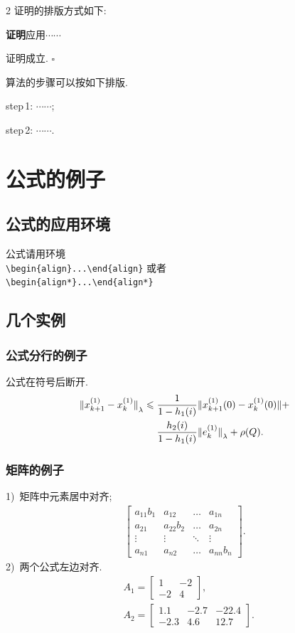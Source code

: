 \documentclass{ctacn}%
\begin{document}
\begin{multicols}{2}
证明的排版方式如下:

\textbf{证明}\quad 应用$\cdots\cdots$

证明成立. {\Large$\square$}

算法的步骤可以按如下排版.

step\,1: $\cdots\cdots$;

step\,2: $\cdots\cdots$.


\section{公式的例子}
\subsection{公式的应用环境}
公式请用环境\\
\verb|\begin{align}...\end{align}|
或者\\
\verb|\begin{align*}...\end{align*}|%
\subsection{几个实例}

\subsubsection{公式分行的例子}
公式在符号后断开.
\begin{align}
{\Arrowvert x^{(1)}_{k+1}-x^{(1)}_k\Arrowvert}_\lambda\leqslant \;&
\frac{1}{1-h_1(i)}\Arrowvert x^{(1)}_{k+1}(0)-x^{(1)}_k(0)\Arrowvert+\notag\\
&\frac{h_2(i)}{1-h_1(i)}{\Arrowvert
	e^{(1)}_k\Arrowvert}_\lambda+\rho(Q).
\end{align}


\subsubsection{矩阵的例子}
1)~矩阵中元素居中对齐;
\begin{align}
\left[\begin{array}{cccc}
a_{11}b_1& a_{12}&\dots &a_{1n}\\
a_{21}& a_{22}b_2&\dots &a_{2n}\\
\vdots&\vdots& \ddots   &\vdots\\
a_{n1}& a_{n2}&\dots &a_{nn}b_n
\end{array}\right].\end{align}
2)~两个公式左边对齐.
\begin{align}
&A_1=\left[\begin{array}{cc} 1& -2\\-2 &4
\end{array}\right],\\
&A_2=\left[\begin{array}{ccc} 1.1 &-2.7&-22.4\\-2.3 &4.6 &12.7
\end{array}\right].
\end{align}



\end{multicols}
\end{document}
